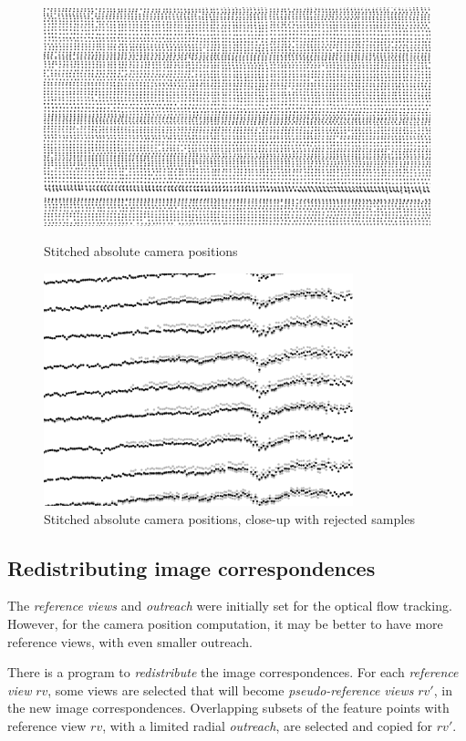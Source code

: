 \documentclass[11pt]{scrreprt}
\begin{document}
\begin{figure}
\centering

\includegraphics[width=\textwidth]{abspos_out.pdf}
\caption{Stitched absolute camera positions}
\label{fig:abspos_out}
\vspace{2cm}

\includegraphics[width=0.8\textwidth]{abspos.pdf}
\caption{Stitched absolute camera positions, close-up with rejected samples}
\label{fig:abspos}

\end{figure}


\subsection{Redistributing image correspondences}
The \emph{reference views} and \emph{outreach} were initially set for the optical flow tracking. However, for the camera position computation, it may be better to have more reference views, with even smaller outreach.

There is a program to \emph{redistribute} the image correspondences. For each \emph{reference view} $rv$, some views are selected that will become \emph{pseudo-reference views} $rv'$, in the new image correspondences. Overlapping subsets of the feature points with reference view $rv$, with a limited radial \emph{outreach}, are selected and copied for $rv'$.
\end{document}
